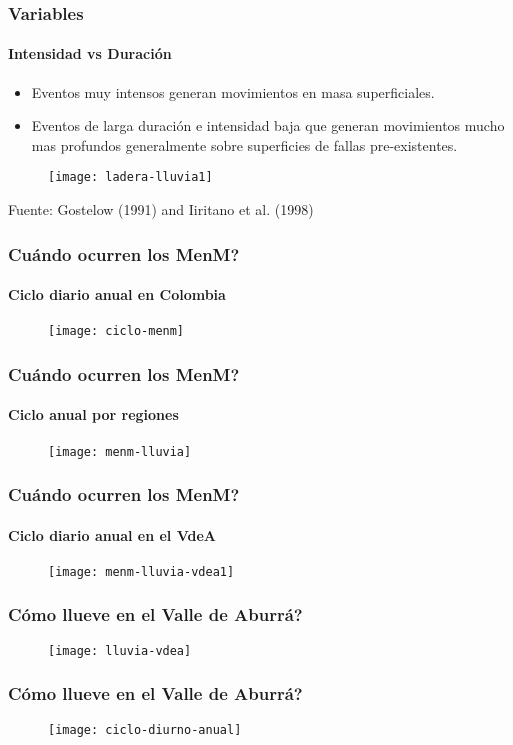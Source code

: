 \documentclass[12pt]{beamer}
\begin{document}
\begin{frame}
\frametitle{Variables}
\framesubtitle{Intensidad vs Duración}
\scriptsize{
\begin{itemize} 
\item Eventos muy intensos generan movimientos en masa superficiales. 
\vfill
\item Eventos de larga duración e intensidad baja que generan movimientos mucho mas profundos generalmente sobre superficies de fallas pre-existentes. 
\end{itemize}
}
\vfill
\begin{figure}
\centering
\texttt{[image: ladera-lluvia1]} 
\end{figure}
\tiny{Fuente: Gostelow (1991) and Iiritano et al. (1998)}
\end{frame}
\begin{frame}
\frametitle{Cuándo ocurren los MenM?}
\framesubtitle{Ciclo diario anual en Colombia}
\begin{figure}
\centering
\texttt{[image: ciclo-menm]} 
\end{figure}
\end{frame}
\begin{frame}
\frametitle{Cuándo ocurren los MenM?}
\framesubtitle{Ciclo anual por regiones}
\begin{figure}
\centering
\texttt{[image: menm-lluvia]} 
\end{figure}
\end{frame}
\begin{frame}
\frametitle{Cuándo ocurren los MenM?}
\framesubtitle{Ciclo diario anual en el VdeA}
\begin{figure}
\texttt{[image: menm-lluvia-vdea1]} 
\end{figure}
\end{frame}
\begin{frame}
\frametitle{Cómo llueve en el Valle de Aburrá?}
\begin{figure}
\centering
\texttt{[image: lluvia-vdea]} 
\end{figure}
\end{frame}
\begin{frame}
\frametitle{Cómo llueve en el Valle de Aburrá?}
\begin{figure}
\centering
\texttt{[image: ciclo-diurno-anual]} 
\end{figure}
\end{frame}
\end{document}
